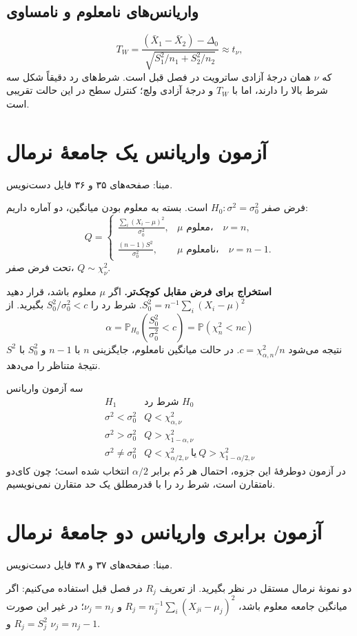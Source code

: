 \documentclass[12pt,a4paper,oneside]{report}
\newcounter{ex}[chapter]
\newcommand{\source}[1]{\par{\small\color{muted} مبنا: صفحه‌های #1 فایل دست‌نویس.}\par}
\newcommand{\Prob}{\mathbb P}
\begin{document}
\subsection{واریانس‌های نامعلوم و نامساوی}
\[
T_W=\frac{(\bar X_1-\bar X_2)-\Delta_0}
{\sqrt{S_1^2/n_1+S_2^2/n_2}}\approx t_\nu,
\]
که $\nu$ همان درجهٔ آزادی ساترویت در فصل قبل است. شرط‌های رد دقیقاً شکل سه شرط بالا را دارند، اما با $T_W$ و درجهٔ آزادی ولچ؛ کنترل سطح در این حالت تقریبی است.
\section{آزمون واریانس یک جامعهٔ نرمال}
\source{۳۵ و ۳۶}
فرض صفر $H_0:\sigma^2=\sigma_0^2$ است. بسته به معلوم بودن میانگین، دو آماره داریم:
\[
Q=\begin{cases}
\displaystyle\frac{\sum_i(X_i-\mu)^2}{\sigma_0^2},&\mu\text{ معلوم،}\quad\nu=n,\\[5pt]
\displaystyle\frac{(n-1)S^2}{\sigma_0^2},&\mu\text{ نامعلوم،}\quad\nu=n-1.
\end{cases}
\]
تحت فرض صفر، $Q\sim\chi^2_\nu$.

\textbf{استخراج برای فرض مقابل کوچک‌تر.} اگر $\mu$ معلوم باشد، قرار دهید $S_0^2=n^{-1}\sum_i(X_i-\mu)^2$. شرط رد را $S_0^2/\sigma_0^2<c$ بگیرید. از
\[
\alpha=\Prob_{H_0}\left(\frac{S_0^2}{\sigma_0^2}<c\right)
=\Prob(\chi^2_n<nc)
\]
نتیجه می‌شود $c=\chi^2_{\alpha,n}/n$. در حالت میانگین نامعلوم، جایگزینی $n$ با $n-1$ و $S_0^2$ با $S^2$ نتیجهٔ متناظر را می‌دهد.
\begin{result}{سه آزمون واریانس}
\[
\begin{array}{c|c}
H_1&\text{شرط رد }H_0\\\hline
\sigma^2<\sigma_0^2&Q<\chi^2_{\alpha,\nu}\\[2pt]
\sigma^2>\sigma_0^2&Q>\chi^2_{1-\alpha,\nu}\\[2pt]
\sigma^2\ne\sigma_0^2&Q<\chi^2_{\alpha/2,\nu}\ \text{یا}\ Q>\chi^2_{1-\alpha/2,\nu}
\end{array}
\]
در آزمون دوطرفهٔ این جزوه، احتمال هر دُم برابر $\alpha/2$ انتخاب شده است؛ چون کای‌دو نامتقارن است، شرط رد را با قدرمطلق یک حد متقارن نمی‌نویسیم.
\end{result}
\section{آزمون برابری واریانس دو جامعهٔ نرمال}
\source{۳۷ و ۳۸}
دو نمونهٔ نرمال مستقل در نظر بگیرید. از تعریف $R_j$ در فصل قبل استفاده می‌کنیم: اگر میانگین جامعه معلوم باشد، $R_j=n_j^{-1}\sum_i(X_{ji}-\mu_j)^2$ و $\nu_j=n_j$؛ در غیر این صورت $R_j=S_j^2$ و $\nu_j=n_j-1$.
\end{document}

